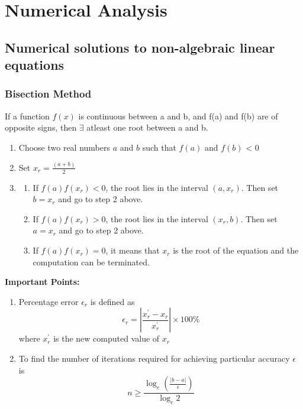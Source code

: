 \documentclass[a4paper,oneside]{book}
\begin{document}
\part{Numerical Analysis}
\chapter{Numerical solutions to non-algebraic linear equations}
\section{Bisection Method}
\begin{theorem}
If a function $f(x)$ is continuous between a and b, and f(a) and f(b) are of opposite signs, then $\exists$ atleast one root between a and b.
\label{Secant Method}
\end{theorem}
\begin{enumerate}
\item Choose two real numbers $a$ and $b$ such that $f(a)$ and $f(b)$ < 0
\item Set $x_r = \frac{(a+b)}{2}$
\item
\begin{enumerate}
\item If $f(a)f(x_r) < 0$, the root lies in the interval $(a,x_r)$. Then set $b = x_r$ and go to step 2 above.
\item If $f(a)f(x_r) > 0$, the root lies in the interval $(x_r,b)$. Then set $a = x_r$ and go to step 2 above.
\item If $f(a)f(x_r) = 0$, it means that $x_r$ is the root of the equation and the computation can be terminated.
\end{enumerate}
\end{enumerate}
\textbf{Important Points:}\\
\begin{enumerate}
\item Percentage error $\epsilon_r$ is defined as \begin{equation}
 \epsilon_r = \left|\frac{x^{'}_r - x_r}{x^{'}_r}\right| \times 100 \%
\end{equation}
where $x^{'}_r$ is the new computed value of $x_r$
\item To find the number of iterations required for achieving particular accuracy $\epsilon$ is \begin{equation}
n \geq 
\frac{\log_{e}{\left(\frac{\left|b-a\right|}{\epsilon}\right)}}{\log_{e}2}
\end{equation}
\end{enumerate}
\end{document}
